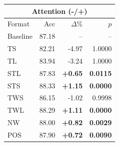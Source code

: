 \begin{tabular}{lrrr}
\toprule
\multicolumn{4}{c}{\textbf{Attention (-/+)}} \\
\midrule
Format & Acc & $\Delta$\% & $p$ \\
\midrule
Baseline & 87.18 & -- & -- \\
\midrule
TS & 82.21 & -4.97 & 1.0000 \\
TL & 83.94 & -3.24 & 1.0000 \\
STL & 87.83 & \textbf{+0.65} & \textbf{0.0115} \\
STS & 88.33 & \textbf{+1.15} & \textbf{0.0000} \\
TWS & 86.15 & -1.02 & 0.9998 \\
TWL & 88.29 & \textbf{+1.11} & \textbf{0.0000} \\
NW & 88.00 & \textbf{+0.82} & \textbf{0.0029} \\
POS & 87.90 & \textbf{+0.72} & \textbf{0.0090} \\
\bottomrule
\end{tabular}